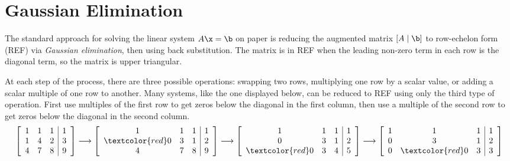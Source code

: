 
\section*{Gaussian Elimination} %

The standard approach for solving the linear system $A\x = \b$ on paper is reducing the augmented matrix $\left[A\mid\b\right]$ to row-echelon form (REF) via \emph{Gaussian elimination}, then using back substitution.
The matrix is in REF when the leading non-zero term in each row is the diagonal term, so the matrix is upper triangular.

At each step of the process, there are three possible operations: swapping two rows, multiplying one row by a scalar value, or adding a scalar multiple of one row to another.
Many systems, like the one displayed below, can be reduced to REF using only the third type of operation.
First use multiples of the first row to get zeros below the diagonal in the first column, then use a multiple of the second row to get zeros below the diagonal in the second column.
%
\begin{align*}
\left[\begin{array}{ccc|c}
1 & 1 & 1 & 1 \\
1 & 4 & 2 & 3 \\
4 & 7 & 8 & 9 \\
\end{array}\right]
\longrightarrow
\left[\begin{array}{ccc|c}
1 & 1 & 1 & 1 \\
\textcolor{red}0 & 3 & 1 & 2 \\
4 & 7 & 8 & 9 \\
\end{array}\right]
\longrightarrow
\left[\begin{array}{ccc|c}
1 & 1 & 1 & 1 \\
0 & 3 & 1 & 2 \\
\textcolor{red}0 & 3 & 4 & 5 \\
\end{array}\right]
\longrightarrow
\left[\begin{array}{ccc|c}
1 & 1 & 1 & 1 \\
0 & 3 & 1 & 2 \\
0 & \textcolor{red}0 & 3 & 3
\end{array}\right]
\end{align*}


